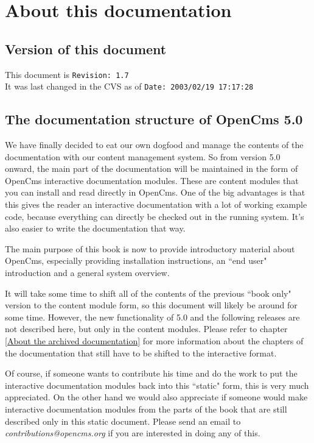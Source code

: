 \chapter{About this documentation}
\label{About this documentation}

\section{Version of this document}

This document is \verb$Revision: 1.7 $  \\
It was last changed in the CVS as of \verb$Date: 2003/02/19 17:17:28 $ \\

\section{The documentation structure of OpenCms 5.0}

We have finally decided to eat our own dogfood and manage the contents of the documentation 
with our content management system.
So from version 5.0 onward, the main part of the documentation will be maintained 
in the form of OpenCms interactive documentation modules.
These are content modules that you can install and read directly in OpenCms.
One of the big advantages is that this gives the reader an interactive documentation 
with a lot of working example code,
because everything can directly be checked out in the running system.
It's also easier to write the documentation that way.

The main purpose of this book is now to provide introductory material about OpenCms,
especially providing installation instructions, an ``end user" introduction and a general system overview.

It will take some time to shift all of the contents of the previous ``book only" version to 
the content module form, so this document will likely be around for some time.
However, the new functionality of 5.0 and the following releases are not described here,
but only in the content modules. 
Please refer to chapter \ref{About the archived documentation} for more information about 
the chapters of the documentation that still have to be shifted to the interactive format.

Of course, if someone wants to contribute his time and do the work to 
put the interactive documentation modules back into this ``static" form, this is very much appreciated. 
On the other hand we would also appreciate if someone would make interactive documentation modules
from the parts of the book that are still described only in this static document.
Please send an email to {\em contributions@opencms.org} if you are interested in doing any of this.

